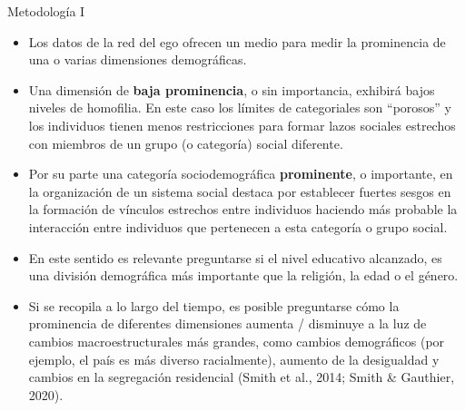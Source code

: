 \documentclass[
  8pt,
  ignorenonframetext,
]{beamer}
\begin{document}
\begin{frame}{Metodología I}
\protect\hypertarget{metodologuxeda-i}{}
\begin{itemize}
\item
  Los datos de la red del ego ofrecen un medio para medir la prominencia
  de una o varias dimensiones demográficas.
\item
  Una dimensión de \textbf{baja prominencia}, o sin importancia,
  exhibirá bajos niveles de homofilia. En este caso los límites de
  categoriales son ``porosos'' y los individuos tienen menos
  restricciones para formar lazos sociales estrechos con miembros de un
  grupo (o categoría) social diferente.
\item
  Por su parte una categoría sociodemográfica \textbf{prominente}, o
  importante, en la organización de un sistema social destaca por
  establecer fuertes sesgos en la formación de vínculos estrechos entre
  individuos haciendo más probable la interacción entre individuos que
  pertenecen a esta categoría o grupo social.
\item
  En este sentido es relevante preguntarse si el nivel educativo
  alcanzado, es una división demográfica más importante que la religión,
  la edad o el género.
\item
  Si se recopila a lo largo del tiempo, es posible preguntarse cómo la
  prominencia de diferentes dimensiones aumenta / disminuye a la luz de
  cambios macroestructurales más grandes, como cambios demográficos (por
  ejemplo, el país es más diverso racialmente), aumento de la
  desigualdad y cambios en la segregación residencial (Smith et al.,
  2014; Smith \& Gauthier, 2020).
\end{itemize}
\end{frame}
\end{document}
